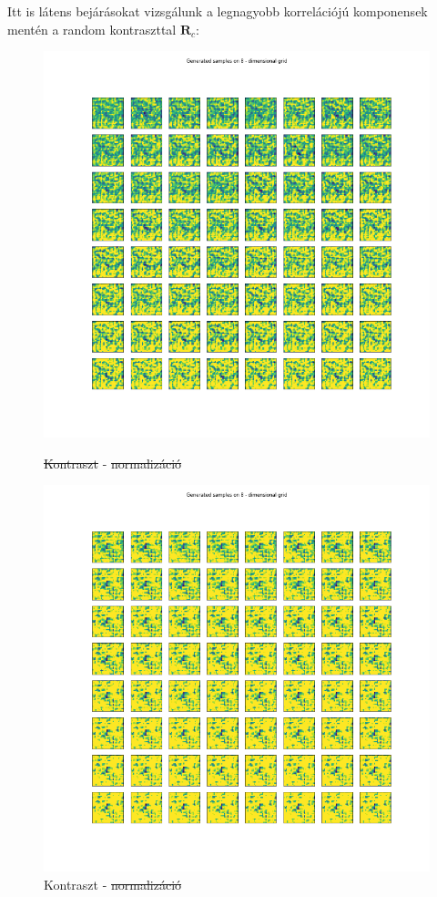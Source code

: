 \documentclass[12pt, english]{article}
\begin{document}
\vspace{4mm}

\par Itt is látens bejárásokat vizsgálunk a legnagyobb korrelációjú komponensek mentén a random kontraszttal $\bm{R}_c$:

\vspace{4mm}

\begin{figure}[H] 
  \label{fig:contrast-correlation} 
  \begin{minipage}{0.5\linewidth}
    \centering
    \includegraphics[width=.62\linewidth]{lvae2/no_norm_no_contrast_sweep.png} 
    \caption{\st{Kontraszt} - \st{normalizáció}} 
    \label{fig:no-contrast-no-norm-sweep}
  \end{minipage}%
  \begin{minipage}{0.5\linewidth}
    \centering
    \includegraphics[width=.62\linewidth]{lvae2/no_norm_contrast_sweep.png} 
    \caption{Kontraszt - \st{normalizáció}} 
    \label{fig:contrast-no-norm-sweep}
  \end{minipage}
\end{figure}
\end{document}
